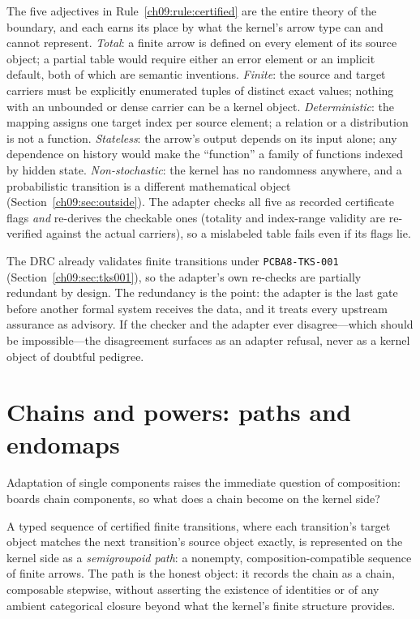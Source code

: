 The five adjectives in Rule~\ref{ch09:rule:certified} are the entire theory of the boundary, and each earns its place by what the kernel's arrow type can and cannot represent. \emph{Total}: a finite arrow is defined on every element of its source object; a partial table would require either an error element or an implicit default, both of which are semantic inventions. \emph{Finite}: the source and target carriers must be explicitly enumerated tuples of distinct exact values; nothing with an unbounded or dense carrier can be a kernel object. \emph{Deterministic}: the mapping assigns one target index per source element; a relation or a distribution is not a function. \emph{Stateless}: the arrow's output depends on its input alone; any dependence on history would make the ``function'' a family of functions indexed by hidden state. \emph{Non-stochastic}: the kernel has no randomness anywhere, and a probabilistic transition is a different mathematical object (Section~\ref{ch09:sec:outside}). The adapter checks all five as recorded certificate flags \emph{and} re-derives the checkable ones (totality and index-range validity are re-verified against the actual carriers), so a mislabeled table fails even if its flags lie.

\begin{remark}\label{ch09:rem:drcagain}
The DRC already validates finite transitions under \texttt{PCBA8-TKS-001} (Section~\ref{ch09:sec:tks001}), so the adapter's own re-checks are partially redundant by design. The redundancy is the point: the adapter is the last gate before another formal system receives the data, and it treats every upstream assurance as advisory. If the checker and the adapter ever disagree---which should be impossible---the disagreement surfaces as an adapter refusal, never as a kernel object of doubtful pedigree.
\end{remark}

\section{Chains and powers: paths and endomaps}\label{ch09:sec:paths}

Adaptation of single components raises the immediate question of composition: boards chain components, so what does a chain become on the kernel side?

\begin{ruleenv}\label{ch09:rule:path}
A typed sequence of certified finite transitions, where each transition's target object matches the next transition's source object exactly, is represented on the kernel side as a \emph{semigroupoid path}: a nonempty, composition-compatible sequence of finite arrows. The path is the honest object: it records the chain as a chain, composable stepwise, without asserting the existence of identities or of any ambient categorical closure beyond what the kernel's finite structure provides.
\end{ruleenv}

